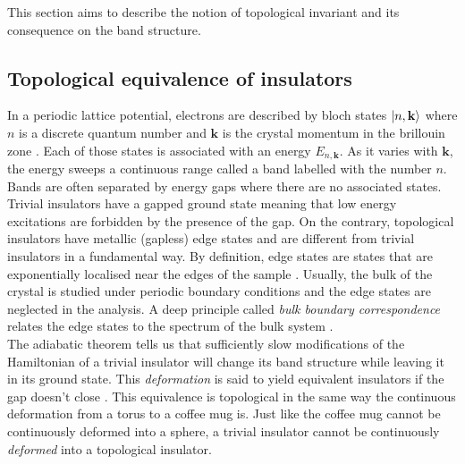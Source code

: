 This section aims to describe the notion of topological invariant and its consequence on the band structure. 
\subsection{Topological equivalence of insulators \label{subsec:Top_Band}}
In a periodic lattice potential, electrons are described by bloch states $\ket{n, \mathbf{k}}$ where $n$ is a discrete quantum number and $\mathbf{k}$ is the crystal momentum in the brillouin zone \cite{girvin_modern_2019}. Each of those states is associated with an energy $E_{n, \mathbf{k}}$.  As it varies with $\mathbf{k}$, the energy sweeps a continuous range called a band labelled with the number $n$. Bands are often separated by energy gaps where there are no associated states. Trivial insulators have a gapped ground state meaning that low energy excitations are forbidden by the presence of the gap. On the contrary, topological insulators have metallic (gapless) edge states\cite{kane_topological_2013} and are different from trivial insulators in a fundamental way. By definition, edge states are states that are exponentially localised near the edges of the sample \cite{asboth_short_2016}. Usually, the bulk of the crystal is studied under periodic boundary conditions and the edge states are neglected in the analysis. A deep principle called \textit{bulk boundary correspondence} relates the edge states to the spectrum of the bulk system \cite{kush_bulk-edge_nodate}. \\ 


The adiabatic theorem tells us that sufficiently slow modifications of the Hamiltonian of a trivial insulator will change its band structure while leaving it in its ground state\cite{born_beweis_1928}. This \textit{deformation} is said to yield equivalent insulators if the gap doesn't close \cite{kane_topological_2013}. This equivalence is topological in the same way the continuous deformation from a torus to a coffee mug is. Just like the coffee mug cannot be continuously deformed into a sphere, a trivial insulator cannot be continuously \textit{deformed} into a topological insulator.\\

